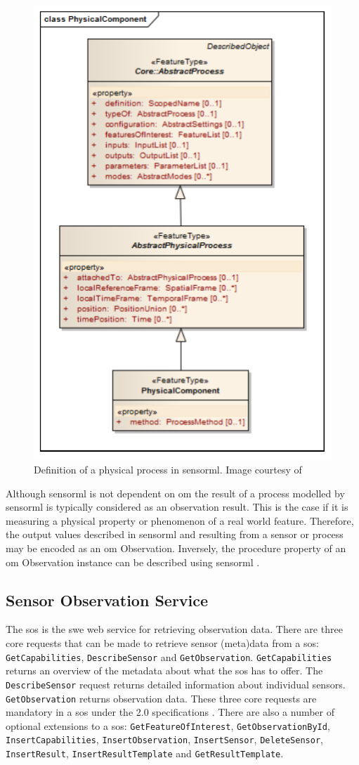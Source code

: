 \begin{figure}
	\centering
	\includegraphics[width=0.6\linewidth]{UML/physicalProcess.png}
	\caption{Definition of a physical process in \ac*{sensorml}. Image courtesy of \cite[p. 57]{SW:OGC7}}
	\label{fig:physicalProcess}
\end{figure}

Although \ac{sensorml} is not dependent on \ac{om} the result of a process modelled by \ac{sensorml} is typically considered as an observation result. This is the case if it is measuring a physical property or phenomenon of a real world feature. Therefore, the output values described in \ac{sensorml} and resulting from a sensor or process may be encoded as an \ac{om} Observation. Inversely, the procedure property of an \ac{om} Observation instance can be described using \ac{sensorml} \citep{SW:OGC7}.

\subsection{Sensor Observation Service}
\label{par:sos}
\begin{sloppypar}
	The \acf{sos} is the \ac{swe} web service for retrieving observation data. There are three core requests that can be made to retrieve sensor (meta)data from a \ac{sos}: \texttt{GetCapabilities}, \texttt{DescribeSensor} and \texttt{GetObservation}. \texttt{GetCapabilities} returns an overview of the metadata about what the \ac{sos} has to offer. The \texttt{DescribeSensor} request returns detailed information about individual sensors. \texttt{GetObservation} returns observation data. These three core requests are mandatory in a \ac{sos} under the 2.0 specifications \citep{SW:OGC2}. There are also a number of optional extensions to a \ac{sos}: \texttt{GetFeatureOfInterest}, \texttt{GetObservationById}, \texttt{InsertCapabilities}, \texttt{InsertObservation}, \texttt{InsertSensor}, \texttt{DeleteSensor}, \texttt{InsertResult}, \texttt{InsertResultTemplate} and \texttt{GetResultTemplate}. 
\end{sloppypar}

